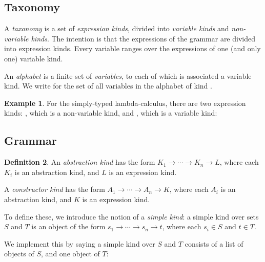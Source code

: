 \documentclass{article}
\theoremstyle{definition}
\newtheorem{example}{Example}[section]
\newtheorem{df}[example]{Definition}
\begin{document}
\subsection{Taxonomy}

A \emph{taxonomy} is a set of \emph{expression kinds}, divided into \emph{variable kinds} and \emph{non-variable kinds}.
The intention is that the expressions of the grammar are divided into expression kinds.  Every
variable ranges over the expressions of one (and only one) variable kind.


An \emph{alphabet} is a finite set of \emph{variables}, to each of which is associated a variable kind.  We write   
for the set of all variables in the alphabet  of kind .


\begin{example}
For the simply-typed lambda-calculus, there are two expression kinds: ,
which is a non-variable kind, and , which is a variable kind:

\end{example}

\subsection{Grammar}

\begin{df}
\label{df:kinds}
An \emph{abstraction kind} has the form $K_1 \rightarrow \cdots \rightarrow K_n \rightarrow L$,
where each $K_i$ is an abstraction kind, and $L$ is an expression kind.

A \emph{constructor kind} has the form $A_1 \rightarrow \cdots \rightarrow A_n \rightarrow K$,
where each $A_i$ is an abstraction kind, and $K$ is an expression kind.
\end{df}

To define these, we introduce the notion of a \emph{simple kind}:
a simple kind over sets $S$ and $T$ is an object of the form $s_1 \rightarrow \cdots \rightarrow s_n \rightarrow t$,
where each $s_i \in S$ and $t \in T$.

We implement this by saying a simple kind over $S$ and $T$ consists of a list of objects of $S$, and one object of $T$:
\end{document}
